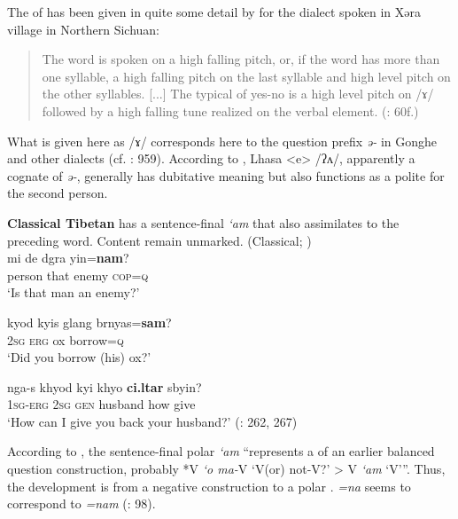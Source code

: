The  of   has been given in quite some detail by \citet{Sun1986} for the dialect spoken in Xəra village in Northern Sichuan:

\begin{quote}
The  word is spoken on a high falling pitch, or, if the  word has more than one syllable, a high falling pitch on the last syllable and high level pitch on the other syllables. [...] The typical  of yes-no  is a high level pitch on /ɤ/ followed by a high falling tune realized on the verbal element. (\citealt{Sun1986}: 60f.)
\end{quote}

\noindent What is given here as /ɤ/ corresponds here to the question prefix \textit{ə-} in Gonghe and other dialects (cf. \citealt{Sun1993}: 959). According to \citet[128]{Denwood1999}, Lhasa  <e> /ʔʌ/, apparently a cognate of \textit{ə-}, generally has dubitative meaning but also functions as a polite  for the second person.

\textbf{Classical Tibetan} has a sentence-final  \textit{‘am} that also assimilates to the preceding word. Content  remain unmarked.
\ea%
    \label{ex:trans:37}
     (Classical; )\\
    \ea
    \gll mi  de  dgra  yin=\textbf{{nam}}?\\
    person  that  enemy  \textsc{cop=q}\\
    \glt ‘Is that man an enemy?’
    
    \ex
    \gll kyod  kyis  glang  brnyas=\textbf{{sam}}?\\
    2\textsc{sg}  \textsc{erg}  ox  borrow=\textsc{q}\\
    \glt ‘Did you borrow (his) ox?’
    
    \ex
    \gll nga-s    khyod  kyi  khyo \textbf{{ci.ltar}} {sbyin?}\\
    1\textsc{sg}-\textsc{erg}  2\textsc{sg}  \textsc{gen}  husband  how  give\\
    \glt ‘How can I give you back your husband?’ (\citealt{DeLancey2003}: 262, 267)\z\z

According to \citet[267]{DeLancey2003}, the  sentence-final polar  \textit{‘am} “represents a  of an earlier balanced question construction, probably *V \textit{‘o ma-}V ‘V(or) not-V?’ > V \textit{‘am} ‘V’”. Thus, the development is from a negative  construction to a polar .  \textit{=na} seems to correspond to  \textit{=nam} (\citealt{deRoerich1958}: 98).


